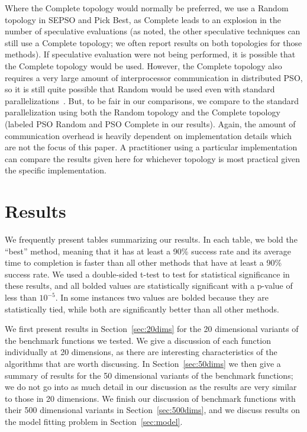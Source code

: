 \documentclass[ms,electronic,twosidetoc,letterpaper,chaptercenter,parttop,equalmargins]{byumsphd}
\renewcommand{\sec}[1]{Section~\ref{sec:#1}}
\begin{document}
Where the Complete topology would normally be preferred, we use a Random
topology in SEPSO and Pick Best, as Complete leads to an explosion in the
number of speculative evaluations (as noted, the other speculative techniques
can still use a Complete topology; we often report results on both topologies
for those methods).  If speculative evaluation were not being performed, it is
possible that the Complete topology would be used.  However, the Complete
topology also requires a very large amount of interprocessor communication in
distributed PSO, so it is still quite possible that Random would be used even
with standard parallelizations~\citep{mcnabb-2009-large-particle-swarms}.  But,
to be fair in our comparisons, we compare to the standard parallelization using
both the Random topology and the Complete topology (labeled PSO Random and PSO
Complete in our results).  Again, the amount of communication overhead is
heavily dependent on implementation details which are not the focus of this
paper.  A practitioner using a particular implementation can compare the
results given here for whichever topology is most practical given the specific
implementation.

\chapter{Results}
\label{sec:results}

We frequently present tables summarizing our results.  In each table, we bold
the ``best'' method, meaning that it has at least a 90\% success rate and its
average time to completion is faster than all other methods that have at least
a 90\% success rate.  We used a double-sided t-test to test for statistical
significance in these results, and all bolded values are statistically
significant with a p-value of less than $10^{-5}$.  In some instances two
values are bolded because they are statistically tied, while both are
significantly better than all other methods.

We first present results in \sec{20dims} for the 20 dimensional variants of the
benchmark functions we tested.  We give a discussion of each function
individually at 20 dimensions, as there are interesting characteristics of the
algorithms that are worth discussing.  In \sec{50dims} we then give a summary
of results for the 50 dimensional variants of the benchmark functions; we do
not go into as much detail in our discussion as the results are very similar to
those in 20 dimensions.  We finish our discussion of benchmark functions with
their 500 dimensional variants in \sec{500dims}, and we discuss results on the
model fitting problem in \sec{model}.
\end{document}
